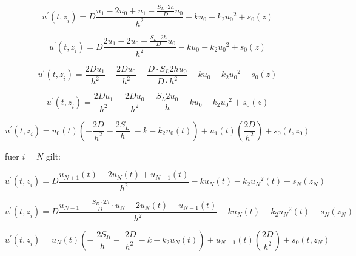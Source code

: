 \begin{equation}
u^{\prime } \left(t{,z}_i \right)=D\frac{u_1 -{2u}_0 +u_1 -\frac{S_L \cdot 2h}{D}u_0 }{h^2 }-ku_0 -k_2 {u_0 }^2 +s_0 \left(z\right)	
\end{equation}

\begin{equation}
	u^{\prime } \left(t{,z}_i \right)=D\frac{2u_1 -{2u}_0 -\frac{S_L \cdot 2h}{D}u_0 }{h^2 }-ku_0 -k_2 {u_0 }^2 +s_0 \left(z\right)
\end{equation}

\begin{equation}
	u^{\prime } \left(t{,z}_i \right)=\frac{2{Du}_1 }{h^2 }-\frac{2{Du}_0 }{h^2 }-\frac{D\cdot S_L 2{hu}_0 }{D\cdot h^2 }-ku_0 -k_2 {u_0 }^2 +s_0 \left(z\right)
\end{equation}

\begin{equation}
	u^{\prime } \left(t{,z}_i \right)=\frac{2{Du}_1 }{h^2 }-\frac{2{Du}_0 }{h^2 }-\frac{S_L 2u_0 }{h}-ku_0 -k_2 {u_0 }^2 +s_0 \left(z\right)
\end{equation}

\begin{equation}
	u^{\prime } \left(t{,z}_i \right)=u_0 \left(t\right)\left(-\frac{2D}{h^2 }-\frac{{2S}_L }{h}\;-k-k_2 u_0 \left(t\right)\right)+u_1 \left(t\right)\left(\frac{2D}{h^2 }\right)+s_0 \left(t,z_0 \right)
\end{equation}


fuer $ i = N $ gilt:

\begin{equation}
	u^{\prime } \left(t{,z}_i \right)=D\frac{u_{N+1} \left(t\right)-{2u}_N \left(t\right)+u_{N-1} \left(t\right)}{h^2 }-ku_N \left(t\right)-k_2 {u_N }^2 \left(t\right)+s_N \left(z_N \right)
\end{equation}


\begin{equation}
	u^{\prime } \left(t{,z}_i \right)=D\frac{u_{N-1} -\frac{\;S_R \cdot 2h}{D}\cdot u_N -{2u}_N \left(t\right)+u_{N-1} \left(t\right)}{h^2 }-ku_N \left(t\right)-k_2 {u_N }^2 \left(t\right)+s_N \left(z_N \right)	
\end{equation}
	
	
\begin{equation}
	u^{\prime } \left(t{,z}_i \right)=u_N \left(t\right)\left(-\frac{\;2S_R }{h}-\frac{\;2D}{h^2 }-k-k_2 u_N \left(t\right)\right)+u_{N-1} \left(t\right)\left(\frac{2D}{h^2 }\right)+s_0 \left(t,z_N \right)	
\end{equation}

